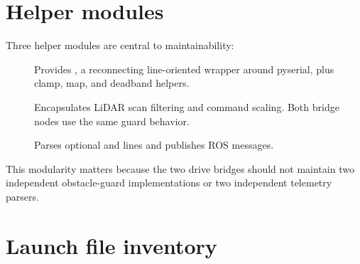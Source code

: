\section{Helper modules}

Three helper modules are central to maintainability:

\begin{description}
\item[] Provides , a reconnecting line-oriented wrapper around pyserial, plus clamp, map, and deadband helpers.
\item[] Encapsulates LiDAR scan filtering and command scaling. Both bridge nodes use the same guard behavior.
\item[] Parses optional  and  lines and publishes ROS messages.
\end{description}

This modularity matters because the two drive bridges should not maintain two independent obstacle-guard implementations or two independent telemetry parsers.

\section{Launch file inventory}

